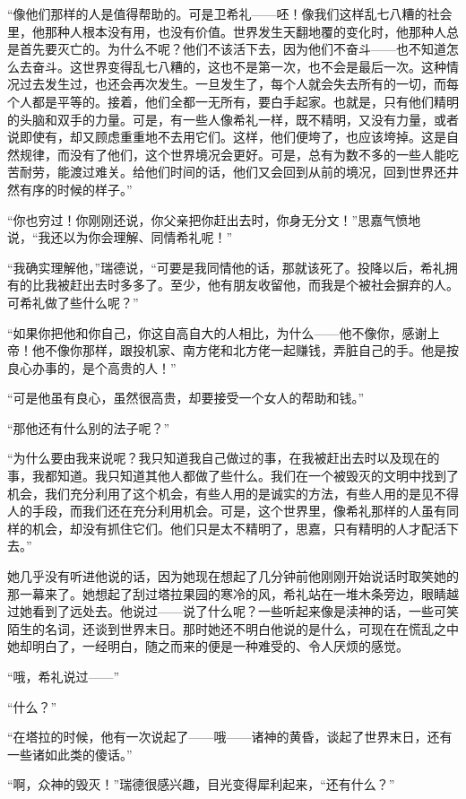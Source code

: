 \par “像他们那样的人是值得帮助的。可是卫希礼——呸！像我们这样乱七八糟的社会里，他那种人根本没有用，也没有价值。世界发生天翻地覆的变化时，他那种人总是首先要灭亡的。为什么不呢？他们不该活下去，因为他们不奋斗——也不知道怎么去奋斗。这世界变得乱七八糟的，这也不是第一次，也不会是最后一次。这种情况过去发生过，也还会再次发生。一旦发生了，每个人就会失去所有的一切，而每个人都是平等的。接着，他们全都一无所有，要白手起家。也就是，只有他们精明的头脑和双手的力量。可是，有一些人像希礼一样，既不精明，又没有力量，或者说即使有，却又顾虑重重地不去用它们。这样，他们便垮了，也应该垮掉。这是自然规律，而没有了他们，这个世界境况会更好。可是，总有为数不多的一些人能吃苦耐劳，能渡过难关。给他们时间的话，他们又会回到从前的境况，回到世界还井然有序的时候的样子。”
\par “你也穷过！你刚刚还说，你父亲把你赶出去时，你身无分文！”思嘉气愤地说，“我还以为你会理解、同情希礼呢！”
\par “我确实理解他，”瑞德说，“可要是我同情他的话，那就该死了。投降以后，希礼拥有的比我被赶出去时多多了。至少，他有朋友收留他，而我是个被社会摒弃的人。可希礼做了些什么呢？”
\par “如果你把他和你自己，你这自高自大的人相比，为什么——他不像你，感谢上帝！他不像你那样，跟投机家、南方佬和北方佬一起赚钱，弄脏自己的手。他是按良心办事的，是个高贵的人！”
\par “可是他虽有良心，虽然很高贵，却要接受一个女人的帮助和钱。”
\par “那他还有什么别的法子呢？”
\par “为什么要由我来说呢？我只知道我自己做过的事，在我被赶出去时以及现在的事，我都知道。我只知道其他人都做了些什么。我们在一个被毁灭的文明中找到了机会，我们充分利用了这个机会，有些人用的是诚实的方法，有些人用的是见不得人的手段，而我们还在充分利用机会。可是，这个世界里，像希礼那样的人虽有同样的机会，却没有抓住它们。他们只是太不精明了，思嘉，只有精明的人才配活下去。”
\par 她几乎没有听进他说的话，因为她现在想起了几分钟前他刚刚开始说话时取笑她的那一幕来了。她想起了刮过塔拉果园的寒冷的风，希礼站在一堆木条旁边，眼睛越过她看到了远处去。他说过——说了什么呢？一些听起来像是渎神的话，一些可笑陌生的名词，还谈到世界末日。那时她还不明白他说的是什么，可现在在慌乱之中她却明白了，一经明白，随之而来的便是一种难受的、令人厌烦的感觉。
\par “哦，希礼说过——”
\par “什么？”
\par “在塔拉的时候，他有一次说起了——哦——诸神的黄昏，谈起了世界末日，还有一些诸如此类的傻话。”
\par “啊，众神的毁灭！”瑞德很感兴趣，目光变得犀利起来，“还有什么？”
